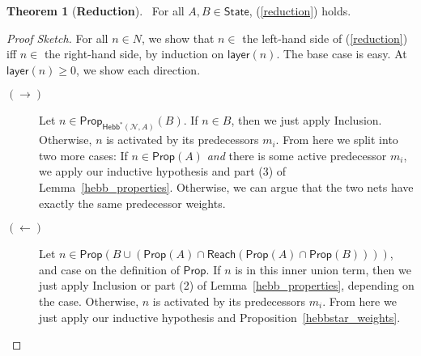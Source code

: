 \documentclass[letterpaper]{article}
\theoremstyle{definition}
\newtheorem{theorem}{Theorem}
\newenvironment{sketch}{\begin{proof}[Proof Sketch]}{\end{proof}}
\newcommand{\State}{\mathsf{State}}
\newcommand{\preds}[1]{\mbox{preds}(#1)}
\newcommand{\layer}[1]{\mathsf{layer}(#1)}
\newcommand{\Net}{\mathcal{N}}
\newcommand{\Prop}{\mathsf{Prop}}
\newcommand{\Reach}{\mathsf{Reach}}
\newcommand{\Hebbstar}[2]{\mathsf{Hebb}^*(#1, #2)}
\begin{document}
\begin{theorem}[\textbf{Reduction}]~\label{reduction_theorem} 
For all $A, B \in \State$, (\ref{reduction}) holds.
\end{theorem}
\begin{sketch}
    For all $n \in N$, we show that $n \in $ the left-hand side of (\ref{reduction}) iff $n \in $ the right-hand side, by induction on $\layer{n}$.  The base case is easy.  At $\layer{n} \geq 0$, we show each direction.
    \begin{description}
        \item[$(\rightarrow)$] Let $n \in \Prop_{\Hebbstar{\Net}{A}}(B)$.  If $n \in B$, then we just apply Inclusion.  Otherwise, $n$ is activated by its predecessors $m_i$.  From here we split into two more cases: If $n \in \Prop(A)$ \emph{and} there is some active predecessor $m_i$, we apply our inductive hypothesis and part (3) of Lemma~\ref{hebb_properties}.  Otherwise, we can argue that the two nets have exactly the same predecessor weights.

        \item[$(\leftarrow)$] Let $n \in \Prop(B \cup (\Prop(A) \cap \Reach(\Prop(A) \cap \Prop(B))))$, and case on the definition of $\Prop$.  If $n$ is in this inner union term, then we just apply Inclusion or part (2) of Lemma~\ref{hebb_properties}, depending on the case. Otherwise, $n$ is activated by its predecessors $m_i$.  From here we just apply our inductive hypothesis and Proposition~\ref{hebbstar_weights}.\qedhere
    \end{description}
\end{sketch}
\end{document}
